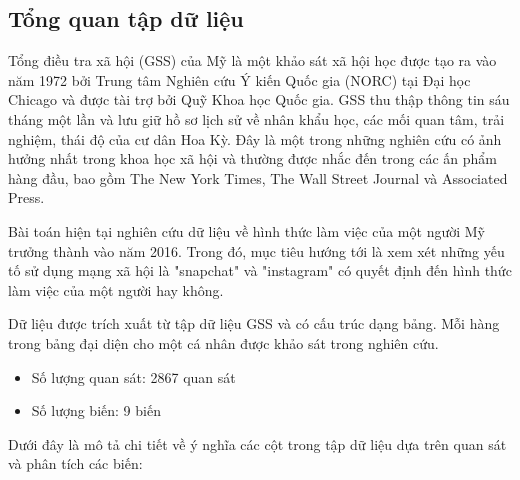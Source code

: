 \subsection{Tổng quan tập dữ liệu}

Tổng điều tra xã hội (GSS) của Mỹ là một khảo sát xã hội học được tạo ra vào năm 1972 bởi Trung tâm Nghiên cứu Ý kiến Quốc gia (NORC) tại Đại học Chicago và được tài trợ bởi Quỹ Khoa học Quốc gia. 
GSS thu thập thông tin sáu tháng một lần và lưu giữ hồ sơ lịch sử về nhân khẩu học, các mối quan tâm, trải nghiệm, thái độ của cư dân Hoa Kỳ. Đây là một trong những nghiên cứu có ảnh hưởng nhất trong khoa học xã hội và thường được nhắc đến trong các ấn phẩm hàng đầu, bao gồm The New York Times, The Wall Street Journal và Associated Press.

Bài toán hiện tại nghiên cứu dữ liệu về hình thức làm việc của một người Mỹ trưởng thành vào năm 2016. 
Trong đó, mục tiêu hướng tới là xem xét những yếu tố sử dụng mạng xã hội là "snapchat" và "instagram" có quyết định đến hình thức làm việc của một người hay không.

Dữ liệu được trích xuất từ tập dữ liệu GSS và có cấu trúc dạng bảng. Mỗi hàng trong bảng đại diện cho một cá nhân được khảo sát trong nghiên cứu.

\begin{itemize}
    \item Số lượng quan sát: 2867 quan sát
    \item Số lượng biến: 9 biến
\end{itemize}

Dưới đây là mô tả chi tiết về ý nghĩa các cột trong tập dữ liệu dựa trên quan sát và phân tích các biến:

